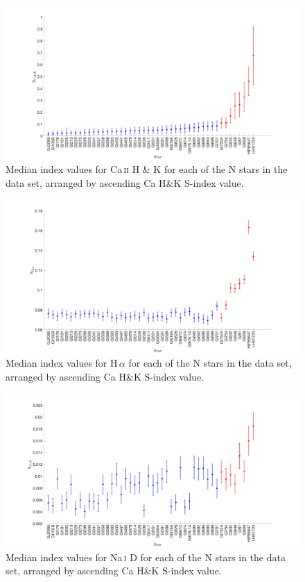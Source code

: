 \begin{figure}
    \vspace{-1cm}
    \centering
    \includegraphics[width=\textwidth]{CaHK.png}
    \caption{Median index values for Ca\,\textsc{ii} H \& K for each of the N stars in the data set, arranged by ascending Ca H\&K S-index value.}
    \label{figCaHK}
\end{figure}
\begin{figure}
    \vspace{-1cm}
    \centering
    \includegraphics[width=\textwidth]{Halpha.png}
    \caption{Median index values for H\,\textsc{$\alpha$} for each of the N stars in the data set, arranged by ascending Ca H\&K S-index value.}
    \label{figHalpha}
\end{figure}
\begin{figure}
    \vspace{-1cm}
    \centering
    \includegraphics[width=\textwidth]{NaD.png}
    \caption{Median index values for Na\,\textsc{i} D for each of the N stars in the data set, arranged by ascending Ca H\&K S-index value.}
    \label{figNaD}
\end{figure}

